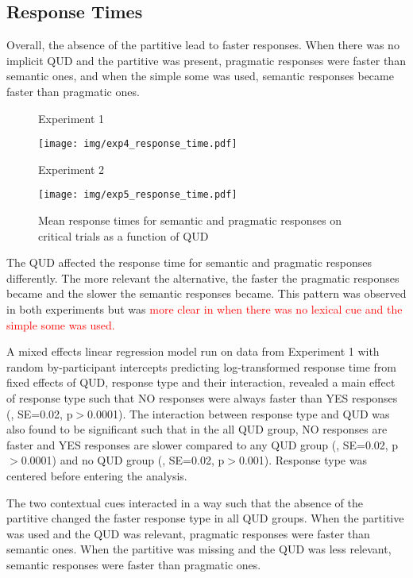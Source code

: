 \documentclass[12pt]{article}
\begin{document}
\subsection*{Response Times}

Overall, the absence of the partitive lead to faster responses. When there was no implicit QUD and the partitive was present, pragmatic responses were faster than semantic ones, and when the simple some was used, semantic responses became faster than pragmatic ones. 

\begin{figure}[!ht] 
    \begin{minipage}{.5\textwidth}
        \caption*{Experiment 1}
        \texttt{[image: img/exp4\_response\_time.pdf]}
    \end{minipage}%
    \begin{minipage}{.5\textwidth}
        \caption*{Experiment 2}
        \texttt{[image: img/exp5\_response\_time.pdf]}
    \end{minipage}%
    \caption{Mean response times for semantic and pragmatic responses on critical trials as a function of QUD}
\end{figure}

The QUD affected the response time for semantic and pragmatic responses differently. The more relevant the alternative, the faster the pragmatic responses became and the slower the semantic responses became. This pattern was observed in both experiments but was \textcolor{red}{more clear in when there was no lexical cue and the simple some was used.}

A mixed effects linear regression model run on data from Experiment 1
with random by-participant intercepts predicting log-transformed response time from fixed effects of QUD, response type and their interaction, revealed a main effect of response type such that NO responses were always faster than YES responses (, SE=0.02, p$>$0.0001). The interaction between response type and QUD was also found to be significant such that in the all QUD group, NO responses are faster and YES responses are slower compared to any QUD group (, SE=0.02, p$>$0.0001) and no QUD group (, SE=0.02, p$>$0.001). Response type was centered before entering the analysis.

The two contextual cues interacted in a way such that the absence of the partitive changed the faster response type in all QUD groups. When the partitive was used and the QUD was relevant, pragmatic responses were faster than semantic ones. When the partitive was missing and the QUD was less relevant, semantic responses were faster than pragmatic ones.
\end{document}
